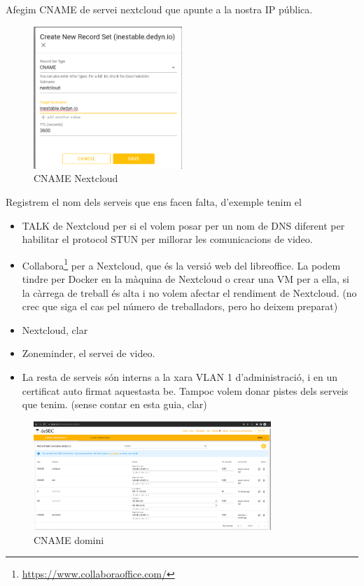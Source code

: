 \documentclass[
  10pt,
]{krantz}
\DeclareRobustCommand{\href}[2]{#2\footnote{\url{#1}}}
\providecommand{\tightlist}{%
  \setlength{\itemsep}{0pt}\setlength{\parskip}{0pt}}
\begin{document}
Afegim CNAME de servei nextcloud que apunte a la nostra IP pública.

\begin{figure}
\centering
\includegraphics[width=0.5\textwidth,height=\textheight]{imatges/proxmox/cname_nextcloud.png}
\caption{CNAME Nextcloud}
\end{figure}

Registrem el nom dels serveis que ens facen falta, d'exemple tenim el

\begin{itemize}
\tightlist
\item
  TALK de Nextcloud per si el volem posar per un nom de DNS diferent per habilitar el protocol STUN per millorar les comunicacions de video.
\item
  \href{https://www.collaboraoffice.com/}{Collabora} per a Nextcloud, que és la versió web del libreoffice. La podem tindre per Docker en la màquina de Nextcloud o crear una VM per a ella, si la càrrega de treball és alta i no volem afectar el rendiment de Nextcloud. (no crec que siga el cas pel número de treballadors, pero ho deixem preparat)
\item
  Nextcloud, clar
\item
  Zoneminder, el servei de video.
\item
  La resta de serveis són interns a la xara VLAN 1 d'administració, i en un certificat auto firmat aquestasta be. Tampoc volem donar pistes dels serveis que tenim. (sense contar en esta guia, clar)
\end{itemize}

\begin{figure}
\centering
\includegraphics[width=0.8\textwidth,height=\textheight]{imatges/proxmox/llista_cname.png}
\caption{CNAME domini}
\end{figure}
\end{document}
